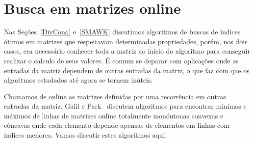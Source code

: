 \section{Busca em matrizes online}
\label{Online}

Nas Seções~\ref{DivConq} e~\ref{SMAWK} discutimos algoritmos de buscas de índices ótimos em matrizes que respeitavam determinadas propriedades, porém, nos dois casos, era necessário conhecer toda a matriz ao início do algoritmo para conseguir realizar o calculo de seus valores. É comum se deparar com aplicações onde as entradas da matriz dependem de outras entradas da matriz, o que faz com que os algoritmos estudados até agora se tornem inúteis.

Chamamos de online as matrizes definidas por uma recorrência em outras entradas da matriz. Galil e Park~\cite{Galil1992} discutem algoritmos para encontrar mínimos e máximos de linhas de matrizes online totalmente monóntonas convexas e côncavas onde cada elemento depende apensas de elementos em linhas com índices menores. Vamos discutir estes algoritmos aqui.


